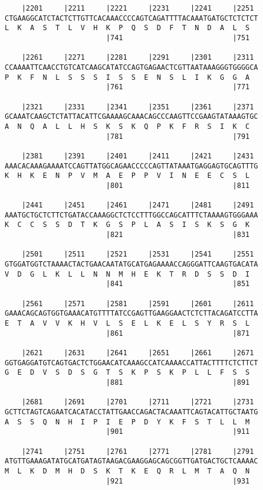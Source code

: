 \documentclass{article}
\begin{document}
\begin{Verbatim}
    |2201     |2211     |2221     |2231     |2241     |2251 
CTGAAGGCATCTACTCTTGTTCACAAACCCCAGTCAGATTTTACAAATGATGCTCTCTCT
L  K  A  S  T  L  V  H  K  P  Q  S  D  F  T  N  D  A  L  S  
                        |741                          |751  
  
    |2261     |2271     |2281     |2291     |2301     |2311 
CCAAAATTCAACCTGTCATCAAGCATATCCAGTGAGAACTCGTTAATAAAGGGTGGGGCA
P  K  F  N  L  S  S  S  I  S  S  E  N  S  L  I  K  G  G  A  
                        |761                          |771  
  
    |2321     |2331     |2341     |2351     |2361     |2371 
GCAAATCAAGCTCTATTACATTCGAAAAGCAAACAGCCCAAGTTCCGAAGTATAAAGTGC
A  N  Q  A  L  L  H  S  K  S  K  Q  P  K  F  R  S  I  K  C  
                        |781                          |791  
  
    |2381     |2391     |2401     |2411     |2421     |2431 
AAACACAAAGAAAATCCAGTTATGGCAGAACCCCCAGTTATAAATGAGGAGTGCAGTTTG
K  H  K  E  N  P  V  M  A  E  P  P  V  I  N  E  E  C  S  L  
                        |801                          |811  
  
    |2441     |2451     |2461     |2471     |2481     |2491 
AAATGCTGCTCTTCTGATACCAAAGGCTCTCCTTTGGCCAGCATTTCTAAAAGTGGGAAA
K  C  C  S  S  D  T  K  G  S  P  L  A  S  I  S  K  S  G  K  
                        |821                          |831  
  
    |2501     |2511     |2521     |2531     |2541     |2551 
GTGGATGGTCTAAAACTACTGAACAATATGCATGAGAAAACCAGGGATTCAAGTGACATA
V  D  G  L  K  L  L  N  N  M  H  E  K  T  R  D  S  S  D  I  
                        |841                          |851  
  
    |2561     |2571     |2581     |2591     |2601     |2611 
GAAACAGCAGTGGTGAAACATGTTTTATCCGAGTTGAAGGAACTCTCTTACAGATCCTTA
E  T  A  V  V  K  H  V  L  S  E  L  K  E  L  S  Y  R  S  L  
                        |861                          |871  
  
    |2621     |2631     |2641     |2651     |2661     |2671 
GGTGAGGATGTCAGTGACTCTGGAACATCAAAGCCATCAAAACCATTACTTTTCTCTTCT
G  E  D  V  S  D  S  G  T  S  K  P  S  K  P  L  L  F  S  S  
                        |881                          |891  
  
    |2681     |2691     |2701     |2711     |2721     |2731 
GCTTCTAGTCAGAATCACATACCTATTGAACCAGACTACAAATTCAGTACATTGCTAATG
A  S  S  Q  N  H  I  P  I  E  P  D  Y  K  F  S  T  L  L  M  
                        |901                          |911  
  
    |2741     |2751     |2761     |2771     |2781     |2791 
ATGTTGAAAGATATGCATGATAGTAAGACGAAGGAGCAGCGGTTGATGACTGCTCAAAAC
M  L  K  D  M  H  D  S  K  T  K  E  Q  R  L  M  T  A  Q  N  
                        |921                          |931  
  

\end{Verbatim}
\end{document}
